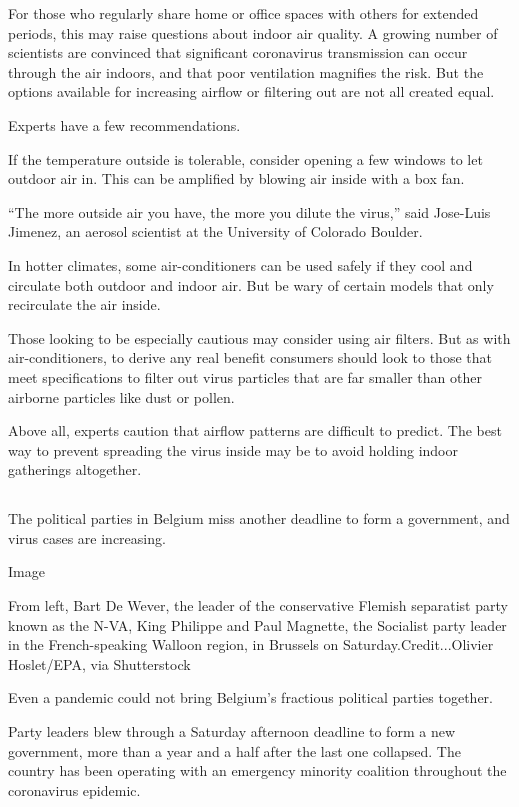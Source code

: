 For those who regularly share home or office spaces with others for
extended periods, this may raise questions about indoor air quality. A
growing number of scientists are convinced that significant coronavirus
transmission can occur through the air indoors, and that poor
ventilation magnifies the risk. But the options available for increasing
airflow or filtering out are not all created equal.

Experts have a few recommendations.

If the temperature outside is tolerable, consider opening a few windows
to let outdoor air in. This can be amplified by blowing air inside with
a box fan.

``The more outside air you have, the more you dilute the virus,'' said
Jose-Luis Jimenez, an aerosol scientist at the University of Colorado
Boulder.

In hotter climates, some air-conditioners can be used safely if they
cool and circulate both outdoor and indoor air. But be wary of certain
models that only recirculate the air inside.

Those looking to be especially cautious may consider using air filters.
But as with air-conditioners, to derive any real benefit consumers
should look to those that meet specifications to filter out virus
particles that are far smaller than other airborne particles like dust
or pollen.

Above all, experts caution that airflow patterns are difficult to
predict. The best way to prevent spreading the virus inside may be to
avoid holding indoor gatherings altogether.

\hypertarget{section-7}{%
\subsection{}\label{section-7}}

The political parties in Belgium miss another deadline to form a
government, and virus cases are increasing.

Image

From left, Bart De Wever, the leader of the conservative Flemish
separatist party known as the N-VA, King Philippe and Paul Magnette, the
Socialist party leader in the French-speaking Walloon region, in
Brussels on Saturday.Credit...Olivier Hoslet/EPA, via Shutterstock

Even a pandemic could not bring Belgium's fractious political parties
together.

Party leaders blew through a Saturday afternoon deadline to form a new
government, more than a year and a half after the last one collapsed.
The country has been operating with an emergency minority coalition
throughout the coronavirus epidemic.

